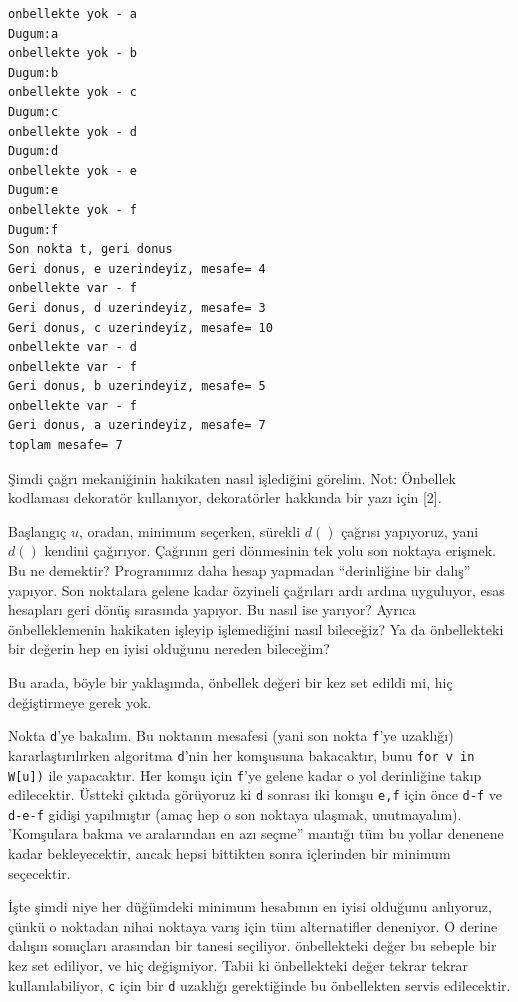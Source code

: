 \documentclass[12pt,fleqn]{article}\usepackage{../../common}
\begin{document}
\begin{verbatim}
onbellekte yok - a
Dugum:a
onbellekte yok - b
Dugum:b
onbellekte yok - c
Dugum:c
onbellekte yok - d
Dugum:d
onbellekte yok - e
Dugum:e
onbellekte yok - f
Dugum:f
Son nokta t, geri donus
Geri donus, e uzerindeyiz, mesafe= 4
onbellekte var - f
Geri donus, d uzerindeyiz, mesafe= 3
Geri donus, c uzerindeyiz, mesafe= 10
onbellekte var - d
onbellekte var - f
Geri donus, b uzerindeyiz, mesafe= 5
onbellekte var - f
Geri donus, a uzerindeyiz, mesafe= 7
toplam mesafe= 7
\end{verbatim}

Şimdi çağrı mekaniğinin hakikaten nasıl işlediğini görelim. Not: Önbellek
kodlaması dekoratör kullanıyor, dekoratörler hakkında bir yazı için [2].

Başlangıç $u$, oradan, minimum seçerken, sürekli $d()$ çağrısı yapıyoruz,
yani $d()$ kendini çağırıyor. Çağrının geri dönmesinin tek yolu son noktaya
erişmek. Bu ne demektir? Programımız daha hesap yapmadan ``derinliğine bir
dalış'' yapıyor. Son noktalara gelene kadar özyineli çağrıları ardı ardına
uyguluyor, esas hesapları geri dönüş sırasında yapıyor. Bu nasıl ise
yarıyor? Ayrıca önbelleklemenin hakikaten işleyip işlemediğini nasıl
bileceğiz?  Ya da önbellekteki bir değerin hep en iyisi olduğunu nereden
bileceğim? 

Bu arada, böyle bir yaklaşımda, önbellek değeri bir kez set edildi mi,
hiç değiştirmeye gerek yok.

Nokta \verb!d!'ye bakalım. Bu noktanın mesafesi (yani son nokta \verb!f!'ye
uzaklığı) kararlaştırılırken algoritma \verb!d!'nin her komşusuna
bakacaktır, bunu \verb!for v in W[u])! ile yapacaktır. Her komşu için
\verb!f!'ye gelene kadar o yol derinliğine takıp edilecektir. Üstteki
çıktıda görüyoruz ki \verb!d! sonrası iki komşu \verb!e,f! için önce
\verb!d-f! ve \verb!d-e-f! gidişi yapılmıştır (amaç hep o son noktaya
ulaşmak, unutmayalım). 'Komşulara bakma ve aralarından en azı seçme''
mantığı tüm bu yollar denenene kadar bekleyecektir, ancak hepsi bittikten
sonra içlerinden bir minimum seçecektir.

İşte şimdi niye her düğümdeki minimum hesabının en iyisi olduğunu
anlıyoruz, çünkü o noktadan nihai noktaya varış için tüm alternatifler
deneniyor. O derine dalışın sonuçları arasından bir tanesi
seçiliyor. önbellekteki değer bu sebeple bir kez set ediliyor, ve hiç
değişmiyor. Tabii ki önbellekteki değer tekrar tekrar kullanılabiliyor,
\verb!c!  için bir \verb!d! uzaklığı gerektiğinde bu önbellekten servis
edilecektir.
\end{document}
